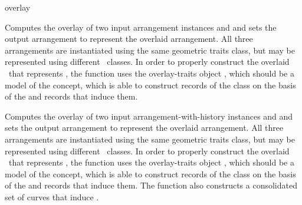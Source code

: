 \ccRefPageBegin

\begin{ccRefFunction}{overlay}

\ccDefinition

Computes the overlay of two input arrangement instances  and
 and sets the output arrangement  to represent the
overlaid arrangement. All three arrangements are instantiated using the
same geometric traits class, but may be represented using different
\dcel\ classes. In order to properly construct the overlaid \dcel\ that
represents , the function uses the overlay-traits object
, which should be a model of the  concept,
which is able to construct records of the  class on the
basis of the  and  records that induce them.





Computes the overlay of two input arrangement-with-history instances
 and  and sets the output arrangement 
to represent the overlaid arrangement. All three arrangements are
instantiated using the same geometric traits class, but may be represented
using different \dcel\ classes. In order to properly construct the
overlaid \dcel\ that represents , the function uses the
overlay-traits object , which should be a model of the
 concept, which is able to construct records of the
 class on the basis of the  and 
records that induce them. The function also constructs a consolidated set
of curves that induce .



\ccSeeAlso

\end{ccRefFunction}

\ccRefPageEnd
